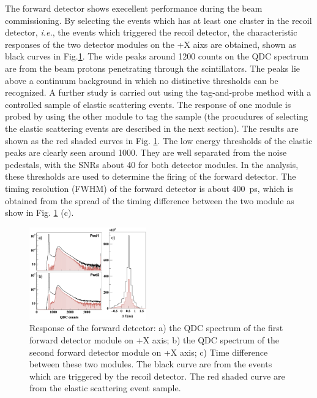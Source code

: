 \documentclass[number,5p]{elsarticle}
\begin{document}
The forward detector shows execellent performance during the beam commissioning.
By selecting the events which has at least one cluster in the recoil
detector, \textit{i.e.}, the events which triggered the recoil detector, the
characteristic responses of the two detector modules on the +X aixs are
obtained, shown as black curves in Fig.\ref {fig:fwd_performance}.
The wide peaks around \num{1200} counts on the QDC spectrum are from the beam protons
penetrating through the scintillators.
The peaks lie above a continuum background in which no distinctive thresholds can be recognized.
A further study is carried out using the tag-and-probe method with a controlled
sample of elastic scattering events.
The response of one module is probed by using the other module to tag the sample
(the procudures of selecting the elastic scattering events are described in the
next section).
The results are shown as the red shaded curves in Fig. \ref{fig:fwd_performance}.
The low energy thresholds of the elastic peaks are clearly seen around \num{1000}.
They are well separated from the noise pedestals, with the SNRs about \num{40} for both detector modules.
In the analysis, these thresholds are used to determine the firing of the
forward detector.
The timing resolution (FWHM) of the forward detector is about \SI{400}{ps}, which is obtained from the spread of the timing difference between the two module as show in Fig. \ref{fig:fwd_performance} (c).
\begin{figure}[htb!]
  \centering
  \includegraphics[width=0.45\textwidth]{./fwd_performance_elastic.png}
  \caption{Response of the forward detector: a) the QDC spectrum of the first forward detector module on +X axis;
    b) the QDC spectrum of the second forward detector module on +X axis; c) Time difference between these two modules.
    The black curve are from the events which are triggered by the recoil
    detector.
    The red shaded curve are from the elastic scattering event sample.
  }
  \label{fig:fwd_performance}
\end{figure}
\end{document}
